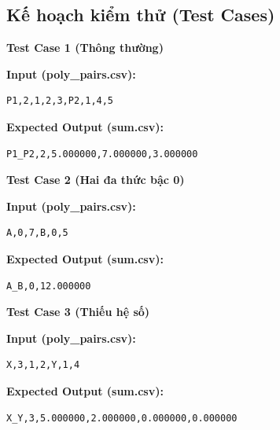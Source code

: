 \subsection{Kế hoạch kiểm thử (Test Cases)}

\textbf{Test Case 1 (Thông thường)}

\textbf{Input (poly\_pairs.csv):}
\begin{lstlisting}
P1,2,1,2,3,P2,1,4,5
\end{lstlisting}

\textbf{Expected Output (sum.csv):}
\begin{lstlisting}
P1_P2,2,5.000000,7.000000,3.000000
\end{lstlisting}

\vspace{0.5cm}

\textbf{Test Case 2 (Hai đa thức bậc 0)}

\textbf{Input (poly\_pairs.csv):}
\begin{lstlisting}
A,0,7,B,0,5
\end{lstlisting}

\textbf{Expected Output (sum.csv):}
\begin{lstlisting}
A_B,0,12.000000
\end{lstlisting}

\vspace{0.5cm}

\textbf{Test Case 3 (Thiếu hệ số)}

\textbf{Input (poly\_pairs.csv):}
\begin{lstlisting}
X,3,1,2,Y,1,4
\end{lstlisting}

\textbf{Expected Output (sum.csv):}
\begin{lstlisting}
X_Y,3,5.000000,2.000000,0.000000,0.000000
\end{lstlisting}